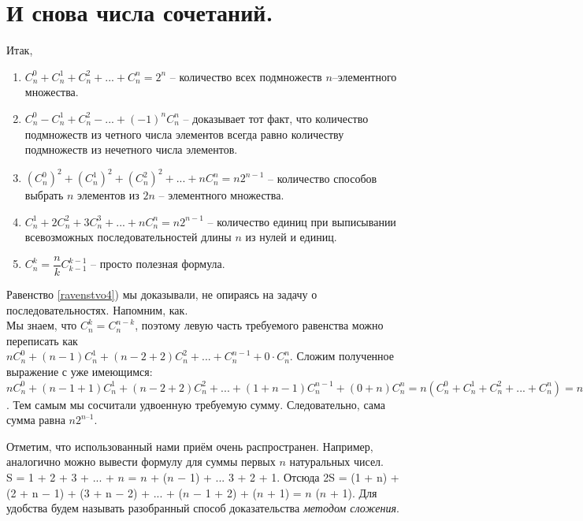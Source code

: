 
\section{И снова числа сочетаний.}

Итак,

\begin{enumerate}[label=\asbuk*), ref=\asbuk*]
    \item $C^0_n + C^1_n + C^2_n + ... + C^n_n = 2^n$ -- количество всех подмножеств $n$--элементного множества.
    \item $C^0_n - C^1_n + C^2_n - ... + (-1)^n C^n_n$ -- доказывает тот факт, что количество подмножеств из четного числа элементов всегда равно количеству подмножеств из нечетного числа элементов.
    \item $(C^0_n)^2 + (C^1_n)^2 + (C^2_n)^2 + ... + n C^n_n = n 2^{n - 1}$ -- количество способов выбрать $n$ элементов из $2n$ -- элементного множества.
    \item \label{ravenstvo4} $C^1_n + 2C^2_n + 3C^3_n + ... + nC^n_n = n2^{n-1}$ -- количество единиц при выписывании всевозможных последовательностей длины $n$ из нулей и единиц.
    \item \label{ravenstvo5}  $C^k_n = \dfrac{n}{k}C^{k - 1}_{k - 1}$ -- просто полезная формула.
\end{enumerate}

Равенство \ref{ravenstvo4}) мы доказывали, не опираясь на задачу о последовательностях. Напомним, как. 
\\ Мы знаем, что $C^k_n = C^{n - k}_n$, поэтому левую часть требуемого равенства можно переписать как 
\\ $n C^0_n + (n - 1) C^1_n + (n - 2 + 2) C^2_n + ... + C^{n-1}_n + 0 \cdot C^n_n$. Сложим полученное выражение с уже имеющимся: $n C^0_n + (n - 1 + 1) C^1_n + (n - 2 + 2) C^2_n + ... + (1 + n - 1) C^{n-1}_n + (0 + n) C^n_n = n (C^0_n + C^1_n + C^2_n + ... + C^n_n) = n 2^n$.
Тем самым мы сосчитали удвоенную требуемую сумму. Следовательно, сама сумма равна $n 2^{n–1}$.

\par

Отметим, что использованный нами приём очень распространен. Например, аналогично можно вывести формулу для суммы первых $n$ натуральных чисел.
\\
S = 1 + 2 + 3 + ... + $n$ = $n$ + ($n$ $-$ 1) + ... 3 + 2 + 1. Отсюда 2S = (1 + n) + (2 + n $-$ 1) + (3 + n $-$ 2) + ... + ($n$ $-$ 1 + 2) + ($n$ + 1) = $n$ ($n$ + 1). Для удобства будем называть разобранный способ доказательства \textit{методом сложения}.

